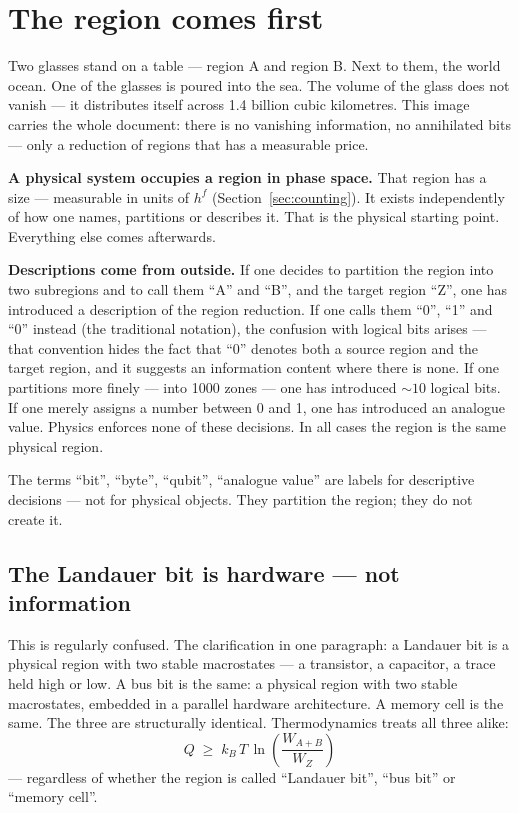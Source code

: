 \bigskip

\section{The region comes first}

Two glasses stand on a table --- region A and region B. Next to them, the world
ocean. One of the glasses is poured into the sea. The volume of the glass does not
vanish --- it distributes itself across 1.4 billion cubic kilometres. This image
carries the whole document: there is no vanishing information, no annihilated
bits --- only a reduction of regions that has a measurable price.

\LS \textbf{A physical system occupies a region in phase space.} That region has a
size --- measurable in units of $h^f$ (Section~\ref{sec:counting}). It exists
independently of how one names, partitions or describes it. That is the physical
starting point. Everything else comes afterwards.

\LB \textbf{Descriptions come from outside.} If one decides to partition the
region into two subregions and to call them “A” and “B”, and the target region
“Z”, one has introduced a description of the region reduction. If one calls them
“0”, “1” and “0” instead (the traditional notation), the confusion with logical
bits arises --- that convention hides the fact that “0” denotes both a source
region and the target region, and it suggests an information content where there
is none. If one partitions more finely --- into 1000 zones --- one has introduced
${\sim}10$ logical bits. If one merely assigns a number between 0 and 1, one has
introduced an analogue value. Physics enforces none of these decisions. In all
cases the region is the same physical region.

The terms “bit”, “byte”, “qubit”, “analogue value” are labels for descriptive
decisions --- not for physical objects. They partition the region; they do not
create it.

\subsection{The Landauer bit is hardware --- not information}

\LB This is regularly confused. The clarification in one paragraph: a Landauer bit
is a physical region with two stable macrostates --- a transistor, a capacitor, a
trace held high or low. A bus bit is the same: a physical region with two stable
macrostates, embedded in a parallel hardware architecture. A memory cell is the
same. The three are structurally identical. Thermodynamics treats all three
alike:
\[
  Q \;\ge\; k_B\,T\,\ln\!\left(\frac{W_{A+B}}{W_Z}\right)
\]
--- regardless of whether the region is called “Landauer bit”, “bus bit” or
“memory cell”.


